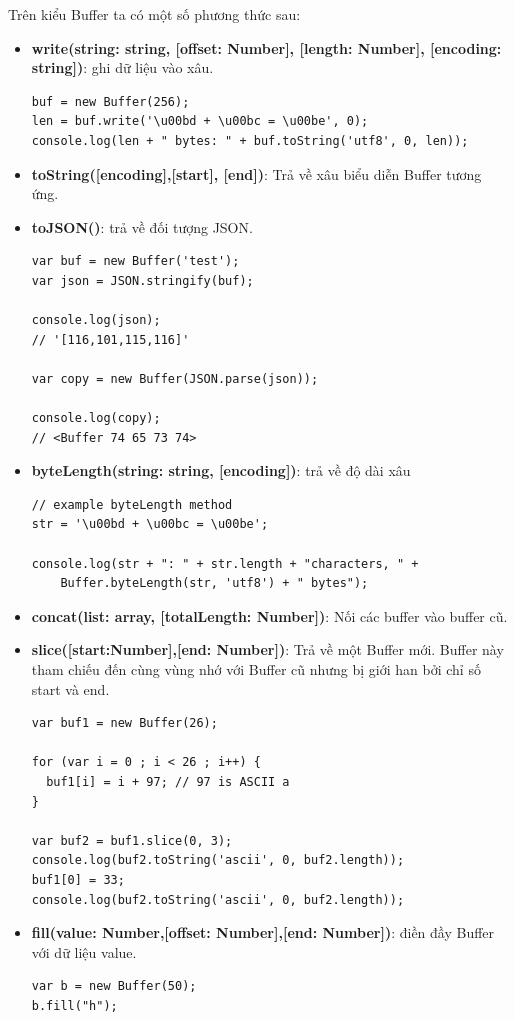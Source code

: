 		Trên kiểu Buffer ta có một số phương thức sau:
		\begin{itemize}
			\item \textbf{write(string: string, [offset: Number], [length: Number], [encoding: string])}: ghi dữ liệu vào xâu. \\
				\begin{verbatim}
buf = new Buffer(256);
len = buf.write('\u00bd + \u00bc = \u00be', 0);
console.log(len + " bytes: " + buf.toString('utf8', 0, len));				
				\end{verbatim}

			\item \textbf{toString([encoding],[start], [end])}: Trả về xâu biểu diễn Buffer tương ứng.
			\item \textbf{toJSON()}: trả về đối tượng JSON. \\
				\begin{verbatim}
var buf = new Buffer('test');
var json = JSON.stringify(buf);

console.log(json);
// '[116,101,115,116]'

var copy = new Buffer(JSON.parse(json));

console.log(copy);
// <Buffer 74 65 73 74>

				\end{verbatim}
			\item \textbf{byteLength(string: string, [encoding])}: trả về độ dài xâu \\
				\begin{verbatim}
// example byteLength method
str = '\u00bd + \u00bc = \u00be';

console.log(str + ": " + str.length + "characters, " +
	Buffer.byteLength(str, 'utf8') + " bytes");
				\end{verbatim}

			\item \textbf{concat(list: array, [totalLength: Number])}: Nối các buffer vào buffer cũ.
			\item \textbf{slice([start:Number],[end: Number])}: Trả về một Buffer mới. Buffer này  tham chiếu đến cùng vùng nhớ với Buffer cũ nhưng bị giới han bởi chỉ số start và end. \\
				\begin{verbatim}
var buf1 = new Buffer(26);

for (var i = 0 ; i < 26 ; i++) {
  buf1[i] = i + 97; // 97 is ASCII a
}

var buf2 = buf1.slice(0, 3);
console.log(buf2.toString('ascii', 0, buf2.length));
buf1[0] = 33;
console.log(buf2.toString('ascii', 0, buf2.length));
				\end{verbatim}
			\item \textbf{fill(value: Number,[offset: Number],[end: Number])}: điền đầy Buffer với dữ liệu value.\\
				\begin{verbatim}
var b = new Buffer(50);
b.fill("h");
				\end{verbatim}
		\end{itemize}
		
